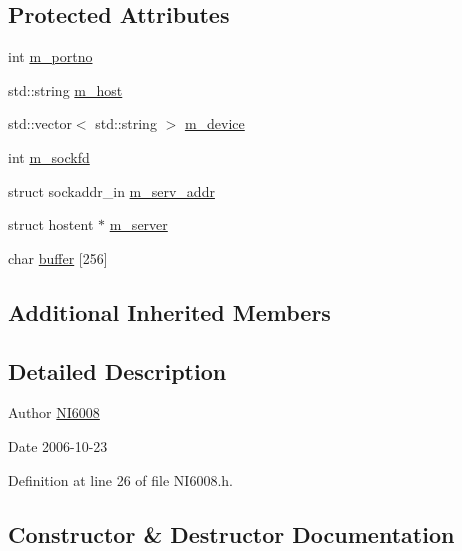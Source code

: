 \subsection*{Protected Attributes}
\begin{DoxyCompactItemize}
\item 
int \hyperlink{classNI6008_aabb914d00c938a12e99c1078f40fb104}{m\+\_\+portno}
\item 
std\+::string \hyperlink{classNI6008_ab8b247caa89b1dc9b9c78b0c1b08ed5d}{m\+\_\+host}
\item 
std\+::vector$<$ std\+::string $>$ \hyperlink{classNI6008_ac7225d517d42b1b7553dc75dccb29b58}{m\+\_\+device}
\item 
int \hyperlink{classNI6008_aa1ca2ab973aaceac58d9d17e482682b5}{m\+\_\+sockfd}
\item 
struct sockaddr\+\_\+in \hyperlink{classNI6008_a5bc7b74f001b1d5a3934d58eadb0b3fa}{m\+\_\+serv\+\_\+addr}
\item 
struct hostent $\ast$ \hyperlink{classNI6008_a789147ad3c7b66da3548a10a109f8cab}{m\+\_\+server}
\item 
char \hyperlink{classNI6008_afd7bb102ac107f43a8f02581e1d3abfc}{buffer} \mbox{[}256\mbox{]}
\end{DoxyCompactItemize}
\subsection*{Additional Inherited Members}


\subsection{Detailed Description}
\begin{DoxyAuthor}{Author}
\hyperlink{classNI6008}{N\+I6008} 
\end{DoxyAuthor}
\begin{DoxyDate}{Date}
2006-\/10-\/23 
\end{DoxyDate}


Definition at line 26 of file N\+I6008.\+h.



\subsection{Constructor \& Destructor Documentation}
\mbox{\label{classNI6008_a7bcb7ee18fa9f17f3582bc3940de8eaa}} 
